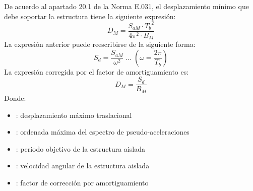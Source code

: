 De acuerdo al apartado 20.1 de la Norma E.031\supercite{E031.1}, el desplazamiento mínimo que debe soportar la estructura tiene la siguiente expresión:
\begin{equation}
    D_M = \dfrac{S_{aM} \cdot {T_b}^2}{4 \pi^2 \cdot B_M}
    \label{eq1_1}
\end{equation}
La expresión anterior puede reescribirse de la siguiente forma:
\begin{equation}
    S_d = \dfrac{S_{aM}}{\omega^2} \; \ldots \; \left(\omega = \frac{2\pi}{T_b}\right) \label{eq1_2}   
\end{equation}
La expresión corregida por el factor de amortiguamiento es:
\begin{equation}
    D_M = \dfrac{S_d}{B_M} \label{eq1_3}
\end{equation}
Donde: 
\begin{itemize}
    \item{}: desplazamiento máximo traslacional
    \item{}: ordenada máxima del espectro de pseudo-aceleraciones
    \item{}: periodo objetivo de la estructura aislada
    \item{\makebox[0.8cm][l]{$\omega$}}: velocidad angular de la estructura aislada
    \item{}: factor de corrección por amortiguamiento
\end{itemize}

